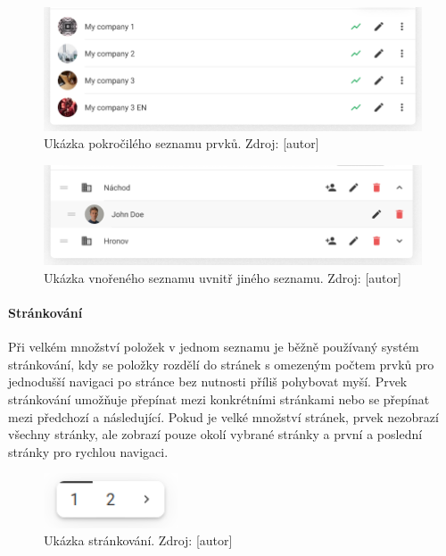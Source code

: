 			\begin{figure}[H]
				\centering
				\includegraphics[width=\linewidth]{obrazky/seznam}\hfill
				\caption{Ukázka pokročilého seznamu prvků. Zdroj: [autor]}
			\end{figure}

			\begin{figure}[H]
				\centering
				\includegraphics[width=\linewidth]{obrazky/vnoreny_seznam}\hfill
				\caption{Ukázka vnořeného seznamu uvnitř jiného seznamu. Zdroj: [autor]}
			\end{figure}

			\paragraph{Stránkování}

			Při velkém množství položek v jednom seznamu je běžně používaný systém stránkování, kdy se položky rozdělí
			do stránek s omezeným počtem prvků pro jednodušší navigaci po stránce bez nutnosti příliš pohybovat myší.
			Prvek stránkování umožňuje přepínat mezi konkrétními stránkami nebo se přepínat mezi předchozí a následující.
			Pokud je velké množství stránek, prvek nezobrazí všechny stránky, ale zobrazí pouze okolí vybrané stránky
			a první a poslední stránky pro rychlou navigaci.

			\begin{figure}[H]
				\centering
				\includegraphics[width=4cm]{obrazky/strankovani}\hfill
				\caption{Ukázka stránkování. Zdroj: [autor]}
			\end{figure}

